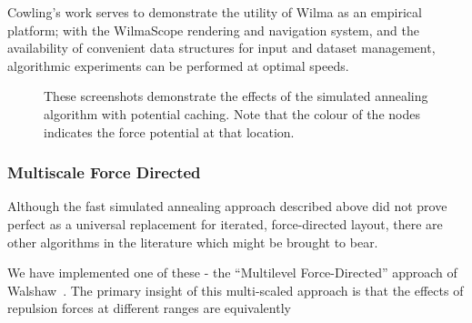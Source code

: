 \documentclass[runningheads]{cl2emult}
\begin{document}
Cowling's work serves to demonstrate the utility of Wilma as an empirical
platform; with the WilmaScope rendering and navigation system, and the
availability of convenient data structures for input and dataset management,
algorithmic experiments can be performed at optimal speeds.

\begin{figure}[h]
  \centering
  \caption{These screenshots demonstrate the effects of the simulated
  annealing algorithm with potential caching.  Note that the colour of
  the nodes indicates the force potential at that location.}
  \label{fig-fastlayout}
\end{figure}


\subsubsection{Multiscale Force Directed}

Although the fast simulated annealing approach described above did not prove
perfect as a universal replacement for iterated, force-directed layout, there
are other algorithms in the literature which might be brought to bear.

We have implemented one of these - the ``Multilevel Force-Directed'' approach
of Walshaw~\cite{walshaw00multilevel}.  The primary insight of this
multi-scaled approach is that the effects of repulsion forces at different
ranges are equivalently 
\end{document}
